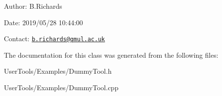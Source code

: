 \begin{DoxyParagraph}{Author\-:}
B.\-Richards 
\end{DoxyParagraph}
\begin{DoxyParagraph}{Date\-:}
2019/05/28 10\-:44\-:00 
\end{DoxyParagraph}
Contact\-: \href{mailto:b.richards@qmul.ac.uk}{\tt b.\-richards@qmul.\-ac.\-uk} 

The documentation for this class was generated from the following files\-:\begin{DoxyCompactItemize}
\item 
User\-Tools/\-Examples/Dummy\-Tool.\-h\item 
User\-Tools/\-Examples/Dummy\-Tool.\-cpp\end{DoxyCompactItemize}
